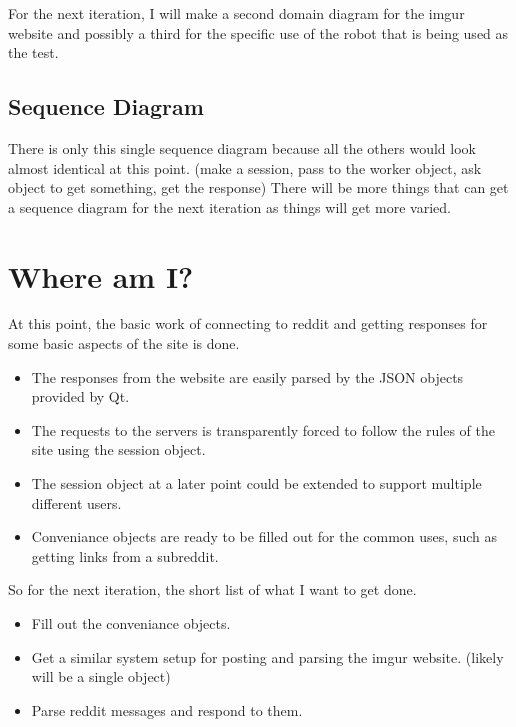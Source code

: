 \documentclass[12pt]{article}
\begin{document}
For the next iteration, I will make a second domain diagram for the imgur website and possibly a third for the specific use of the robot that is being used as the test.

\subsection{Sequence Diagram}

There is only this single sequence diagram because all the others would look almost identical at this point.
(make a session, pass to the worker object, ask object to get something, get the response)
There will be more things that can get a sequence diagram for the next iteration as things will get more varied.

\section{Where am I?}

At this point, the basic work of connecting to reddit and getting responses for some basic aspects of the site is done.
\begin{itemize}
	\item The responses from the website are easily parsed by the JSON objects provided by Qt.
	\item The requests to the servers is transparently forced to follow the rules of the site using the session object.
	\item The session object at a later point could be extended to support multiple different users.
	\item Conveniance objects are ready to be filled out for the common uses, such as getting links from a subreddit.
\end{itemize}

So for the next iteration, the short list of what I want to get done.
\begin{itemize}
	\item Fill out the conveniance objects.
	\item Get a similar system setup for posting and parsing the imgur website. (likely will be a single object)
	\item Parse reddit messages and respond to them.
\end{itemize}

\newpage
\appendix
\end{document}
